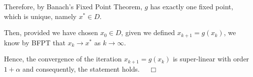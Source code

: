 \documentclass[]{article}
\begin{document}
\begin{enumerate}
Therefore, by Banach's Fixed Point Theorem, $g$ has exactly one fixed point, which is unique, namely $x^* \in D$.

Then, provided we have chosen $x_0 \in D$, given we defined $x_{k+1} =g(x_k)$, we know by BFPT that $x_k \to x^*$ as $k \to \infty$.

Hence, the convergence of the iteration $x_{k+1} = g(x_k)$ is super-linear with order $1 + \alpha$ and consequently, the statement holds. $\quad \Box$

\hrulefill


\end{enumerate}
\end{document}
